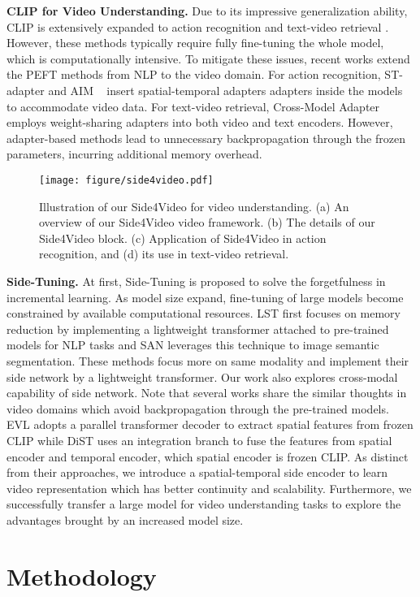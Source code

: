 \documentclass[10pt,twocolumn,letterpaper]{article}
\begin{document}
\noindent\textbf{CLIP for Video Understanding.} Due to its impressive generalization ability, CLIP is extensively expanded to action recognition \cite{atm, Xclip, uniformerv2, Text4vis, bike} and text-video retrieval \cite{wu2023cap4video,clip4clip, drl, ts2_net, uatvr, clip2video, stan}. However, these methods typically require fully fine-tuning the whole model, which is computationally intensive. To mitigate these issues, recent works \cite{st_adapter, aim, crossadapter, uniadapter, dist, clip-prompting} extend the PEFT methods \cite{lora, PEFT4nlp, bitfit, prompt_tuning4nlp, lst} from NLP to the video domain. For action recognition, ST-adapter \cite{st_adapter} and AIM ~\cite{aim} insert spatial-temporal adapters adapters inside the models to accommodate video data. For text-video retrieval, Cross-Model Adapter \cite{crossadapter} employs weight-sharing adapters into both video and text encoders. However, adapter-based methods lead to unnecessary backpropagation through the frozen parameters, incurring additional memory overhead.


\begin{figure*}[ht]
  \centering
  \texttt{[image: figure/side4video.pdf]}
  \caption{Illustration of our Side4Video for video understanding. (a) An overview of our Side4Video video framework. (b) The details of our Side4Video block. (c) Application of Side4Video in action recognition, and (d) its use in text-video retrieval.}
   \label{fig:network}
\end{figure*}



\noindent\textbf{Side-Tuning.} At first, Side-Tuning \cite{side-tuning} is proposed to solve the forgetfulness in incremental learning. As model size expand, fine-tuning of large models become constrained by available computational resources. LST \cite{lst} first focuses on memory reduction by implementing a lightweight transformer attached to pre-trained models for NLP tasks and SAN \cite{side_ss} leverages this technique to image semantic segmentation. These methods focus more on same modality and implement their side network by a lightweight transformer. Our work also explores cross-modal capability of side network. Note that several works \cite{evl,dist} share the similar thoughts in video domains which avoid backpropagation through the pre-trained models. EVL \cite{evl} adopts a parallel transformer decoder to extract spatial features from frozen CLIP while DiST \cite{dist} uses an integration branch to fuse the features from spatial encoder and temporal encoder, which spatial encoder is frozen CLIP. As distinct from their approaches, we introduce a spatial-temporal side encoder to learn video representation which has better continuity and scalability. Furthermore, we successfully transfer a large model for video understanding tasks to explore the advantages brought by an increased model size. \section{Methodology}
\end{document}
